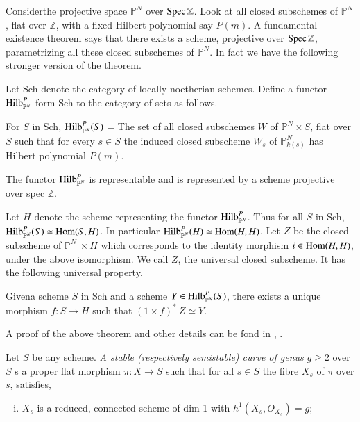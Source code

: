 {\bigskip

\medskip
{}%

Consider\pageoriginale the projective space $\mathbb{P}^N$ over $ \operatorname{Spec}
\mathbb{Z}$. Look at all closed subschemes of $\mathbb{P}^N$, flat
over $\mathbb{Z}$, with a fixed  Hilbert polynomial say $P (m)$. A
fundamental existence theorem says  that there exists a scheme,
projective over $ \operatorname{Spec} \mathbb{Z}$, parametrizing all these closed
subschemes of $\mathbb{P}^N$. In fact we have the following stronger
version of the  theorem.\label{page11} 

Let Sch denote the category of locally noetherian schemes. Define a
functor $ \operatorname{Hilb}^P_{\mathbb{P}^N}$ form  Sch to the category of sets as
follows.  

For $S$ in Sch, $\operatorname{Hilb}^P_{\mathbb{P}^N} (S) $ = The set of all
closed subschemes  $W$ of  $\mathbb{P}^N \times S$, flat over  $S$
such that for every $s \in S$ the induced closed  subscheme
$W_s$ of $\mathbb{P}^{N}_{k(s)}$ has Hilbert polynomial $P (m)$. 

\setcounter{subtheorem}{2}
\begin{subtheorem}\label{chap0:subthm0.1.3}%
The functor $\operatorname{Hilb}^P_{\mathbb{P}^{N}}$ is representable and is
represented by a scheme projective over spec $\mathbb{Z}$. 
\end{subtheorem}

Let $H$ denote the scheme representing the functor
$\operatorname{Hilb}^P_{\mathbb{P}^{N}}$. Thus for all $S$ in Sch,
$\operatorname{Hilb}^{P}_{\mathbb{P}^{N}} (S) \simeq \operatorname{Hom} (S,H)$. In particular  $
\operatorname{Hilb}^{P}_{\mathbb{P}^{N}} (H) \simeq \operatorname{Hom} (H,H)$. Let $Z$ be the
closed  subscheme of $ \mathbb{P}^N ~ \times H $ which corresponds to
the  identity morphism $ i \in \operatorname{Hom} (H,H)$, under the  above
isomorphism. We call $Z$, the universal closed subscheme. It has the
following universal property.     

Given\pageoriginale a scheme $S$ in Sch and  a scheme  $ Y \in
\operatorname{Hilb}^P_{\mathbb{P}^{N}} (S) $, there exists a unique morphism $f: S
\rightarrow H$ such that  $(1 \times f)^*  ~ Z \simeq Y$. 

A proof  of the above theorem and other details  can be fond in \cite{key2},
\cite{key6}. 

\bigskip

\medskip
{}\label{c0:st_curves} %


\setcounter{subdefin}{3}
\begin{subdefin}\label{chap0:subdef0.1.4}%
 Let  $S$ be any scheme. {\em A stable (respectively semista\-ble) 
   curve of genus} $g \ge 2$ over $S$ s a proper flat morphism  $ \pi :
 X \rightarrow S $ such that for all  $ s \in S$  the fibre
 $X_s$ of $\pi$ over $s$, satisfies,  
\begin{enumerate}[i)]
\item $X_s$  is  a reduced, connected scheme of dim 1 with $h^1
  (X_s, O_{X_{s}}) = g$;  


\end{enumerate}
\end{subdefin}}
